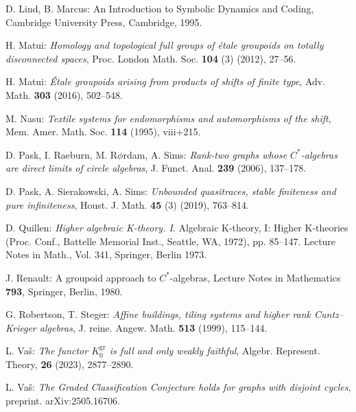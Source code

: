 \documentclass[12pt]{amsart}
\theoremstyle{definition}
\theoremstyle{remark}
\newcommand{\gr}{\operatorname{gr}}
\begin{document}
\begin{thebibliography}{}
D. Lind, B. Marcus: An Introduction to Symbolic Dynamics and Coding, Cambridge University Press, Cambridge, 1995. 

H. Matui: \emph{Homology and topological full groups of \'{e}tale groupoids on totally disconnected spaces}, Proc. London Math. Soc. \textbf{104} (3) (2012), 27--56.

H. Matui: \emph{\'{E}tale groupoids arising from products of shifts of finite type}, Adv. Math. \textbf{303} (2016), 502--548.

M. Nasu: \emph{Textile systems for endomorphisms and automorphisms of the shift}, Mem. Amer. Math. Soc. \textbf{114} (1995), viii+215.

D. Pask, I. Raeburn, M. R$\phi$rdam, A. Sims: \emph{Rank-two graphs whose $C^*$-algebras are direct limits of circle algebras}, J. Funct. Anal. \textbf{239} (2006), 137--178.

D. Pask, A. Sierakowski, A. Sims: \emph{Unbounded quasitraces, stable finiteness and pure infiniteness}, Houst. J. Math. \textbf{45} (3) (2019), 763--814.

D. Quillen: \emph{Higher algebraic K-theory. I}. Algebraic K-theory, I: Higher K-theories (Proc. Conf., Battelle Memorial Inst., Seattle, WA, 1972), pp. 85--147. Lecture Notes in Math., Vol. 341, Springer, Berlin 1973.

J. Renault: A groupoid approach to $C^*$-algebras, Lecture Notes in Mathematics \textbf{793}, Springer, Berlin, 1980.

G. Robertson, T. Steger: \emph{Affine buildings, tiling systems and higher rank Cuntz--Krieger algebras}, J. reine. Angew. Math. \textbf{513} (1999), 115--144.

L. Va\v{s}: \emph{The functor $K_0^{\gr}$ is full and only weakly faithful}, Algebr. Represent. Theory, \textbf{26} (2023), 2877--2890.

L. Va\v{s}: \emph{The Graded Classification Conjecture holds for graphs with disjoint cycles}, preprint. arXiv:2505.16706.

\end{thebibliography}
\end{document}
